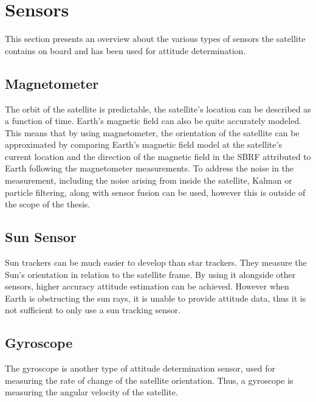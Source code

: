 \section{Sensors}
This section presents an overview about the various types of sensors the satellite contains on board and has been used for attitude determination.
\subsection{Magnetometer}

The orbit of the satellite is predictable, the satellite's location can be described as a function of time. Earth's magnetic field can also be quite accurately modeled. This means that by using magnetometer, the orientation of the satellite can be approximated by comparing Earth's magnetic field model at the satellite's current location and the direction of the magnetic field in the SBRF attributed to Earth following the magnetometer measurements. To address the noise in the measurement, including the noise arising from inside the satellite, Kalman or particle filtering, along with sensor fusion can be used, however this is outside of the scope of the thesis.

\subsection{Sun Sensor}

Sun trackers can be much easier to develop than star trackers. They measure the Sun’s orientation in relation to the satellite frame. By using it alongside other sensors, higher accuracy attitude estimation can be achieved. However when Earth is obstructing the sun rays, it is unable to provide attitude data, thus it is not sufficient to only use a sun tracking sensor.


\subsection{Gyroscope}


The gyroscope is another type of attitude determination sensor, used for measuring the rate of change of the satellite orientation. Thus, a gyroscope is measuring the angular velocity of the satellite.

